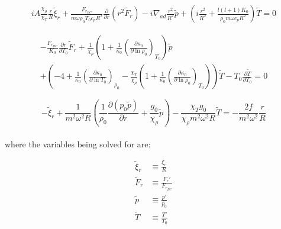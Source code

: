 \documentclass[11pt]{amsart}
\begin{document}
\begin{multline} \label{eq:ent_osc_dim2}
i A \frac{\chi_{\rho}}{\chi_{T}} \frac{r}{R} \tilde{\xi}_{r}
+ \frac{F_{r_{BC}}}{m \omega \rho_{0} T_{0} c_{p} R^{2}} \frac{\partial}{\partial r} \left( r^{2} \tilde{F}_{r} \right)
-  i \nabla_{ad} \frac{r^{2}}{R^{2}} \tilde{p} 
+ \left( i \frac{r^{2}}{R^{2}} + \frac{l (l+1) K_{0}}{\rho_{0} m \omega c_{p} R^{2}} \right) \tilde{T}
=
0
\end{multline}

\begin{multline} \label{eq:flux_osc_dim2}
- \frac{F_{r_{BC}}}{K_{0}} \frac{\partial r}{\partial T_{0}} \tilde{F}_{r}
+ \frac{1}{\chi_{\rho}} \left( 1 + \frac{1}{\kappa_{0}} \left( \frac{\partial \kappa_{0}}{\partial \ln \rho_{0}} \right)_{T_{0}} \right) \tilde{p} \\
+ \left( - 4 + \frac{1}{\kappa_{0}} \left( \frac{\partial \kappa_{0}}{\partial \ln T_{0}} \right)_{\rho_{0}} - \frac{\chi_{T}}{\chi_{\rho}}  \left(  1 +  \frac{1}{\kappa_{0}}  \left( \frac{\partial \kappa_{0}}{\partial \ln \rho_{0}} \right)_{T_{0}} \right)    \right) \tilde{T}   -   T_{0} \frac{\partial \tilde{T}}{\partial T_{0}}
=
0
\end{multline}

\begin{equation} \label{eq:mom_osc_dim2}
- \tilde{\xi}_{r} 
+ \frac{1}{m^{2} \omega^{2} R} \left(  \frac{1}{\rho_{0}} \frac{\partial \left( p_{0} \tilde{p} \right)}{\partial r} +  \frac{g_{0}}{\chi_{\rho}} \tilde{p} \right)
- \frac{\chi_{T} g_{0}}{\chi_{\rho} m^{2} \omega^{2} R} \tilde{T}
=
- \frac{2 f}{m^{2} \omega^{2}} \frac{r}{R}
\end{equation}
\\

where the variables being solved for are:

\begin{align}
\tilde{\xi}_{r} &\equiv \frac{\xi_{r}}{R} \\
\tilde{F}_{r} &\equiv \frac{F_{r}'}{F_{r_{BC}}} \\
\tilde{p} &\equiv \frac{p'}{p_{0}} \\
\tilde{T} &\equiv \frac{T'}{T_{0}}
\end{align}
\\
\end{document}
